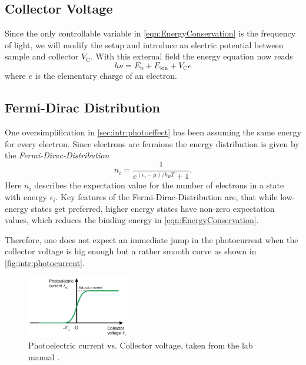 \subsection{Collector Voltage}
\label{sec:colletor_voltage}
Since the only controllable variable in \autoref{eqn:EnergyConservation} is the frequency of light,
we will modify the setup and introduce an electric potential between sample and collector
$V_\text{C}$.
With this external field the energy equation now reads
\begin{equation}
  h\nu = E_\text{b} + E_\text{kin} + V_\text{C} e
  \label{eqn:energy_modified}
\end{equation}
where $e$ is the elementary charge of an electron.

\subsection{Fermi-Dirac Distribution}
\label{sec:intr:fermi-dirac}
One oversimplification in \autoref{sec:intr:photoeffect} has been assuming the same energy for every
electron. Since electrons are fermions the energy distribution is given by the
\textit{Fermi-Dirac-Distribution}
\begin{equation}
  \overline{n}_i = \frac{1}{e^{(\epsilon_i - \mu) / k_BT} + 1}.
\end{equation}
Here $\overline{n}_i$ describes the expectation value for the number of electrons in a state with
energy $\epsilon_i$. Key features of the Fermi-Dirac-Distribution are, that while low-energy states
get preferred, higher energy states have non-zero expectation values, which reduces the binding
energy in \autoref{eqn:EnergyConservation}. 

Therefore, one does not expect an immediate jump in the photocurrent when the collector voltage is
hig enough but a rather smooth curve as shown in \autoref{fig:intr:photocurrent}.

\begin{figure}
    \centering
    \includegraphics[width=0.4\textwidth]{media/photocurrent.png}
    \caption{Photoelectric current vs. Collector voltage, taken from the lab manual \cite{LabInstructions}.}
    \label{fig:intr:photocurrent}
\end{figure}

